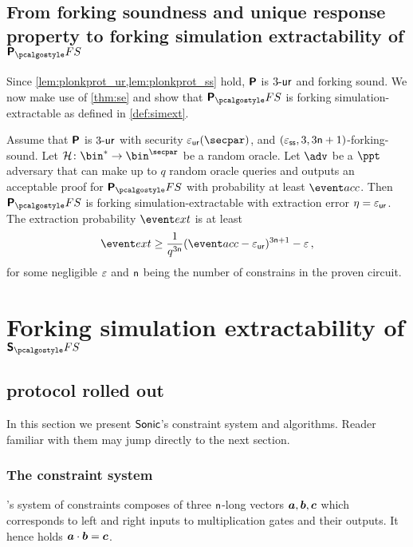 \documentclass[runningheads,10pt]{llncs}
\begin{document}
\subsection{From forking soundness and unique response property to forking simulation
  extractability of $\plonkprotfs$}
Since \cref{lem:plonkprot_ur,lem:plonkprot_ss} hold, $\bm{\mathsf{P}}$ is ${3\text{-}\mathsf{ur}}$
and forking sound. We now make use of \cref{thm:se} and show that
$\plonkprot_\fs$ is forking simulation-extractable as defined in
\cref{def:simext}.

\begin{corollary}
\label{thm:plonkprotfs_se}
Assume that $\bm{\mathsf{P}}$ is ${3\text{-}\mathsf{ur}}$ with security $\epsur(\secpar)$, and
$(\varepsilon_{\mathsf{ss}}, 3, 3\mathsf{n} + 1)$-forking-sound. Let
$\ro\colon \bin^* \to \bin^\secpar$ be a random oracle. Let $\advse$ be a $\ppt$
adversary that can make up to $q$ random oracle queries and outputs an
acceptable proof for $\plonkprotfs$ with probability at least $\accProb$. Then
$\plonkprotfs$ is forking simulation-extractable with extraction error
$\eta = \varepsilon_{\mathsf{ur}}$. The extraction probability $\extProb$ is at least
\[
	\extProb \geq \frac{1}{q^{3 \noofc}} (\accProb - \epsur)^{3\noofc + 1} -\eps\,,
\]
for some negligible $\varepsilon$ and $\mathsf{n}$ being the number of
constrains in the proven circuit.
\end{corollary}

\section{Forking simulation extractability of $\sonicprotfs$}
\label{sec:sonic}
\subsection{\sonic{} protocol rolled out}
In this section we present ${\textnormal{\textsf{Sonic}}}$'s constraint system and algorithms. Reader
familiar with them may jump directly to the next section.

\subsubsection{The constraint system}
\label{sec:sonic_constraint_system}
\sonic's system of constraints composes of three $\mathsf{n}$-long vectors
$\va, \vb, \vc$ which corresponds to left and right inputs to multiplication
gates and their outputs. It hence holds $\va \cdot \vb = \vc$.
\end{document}
